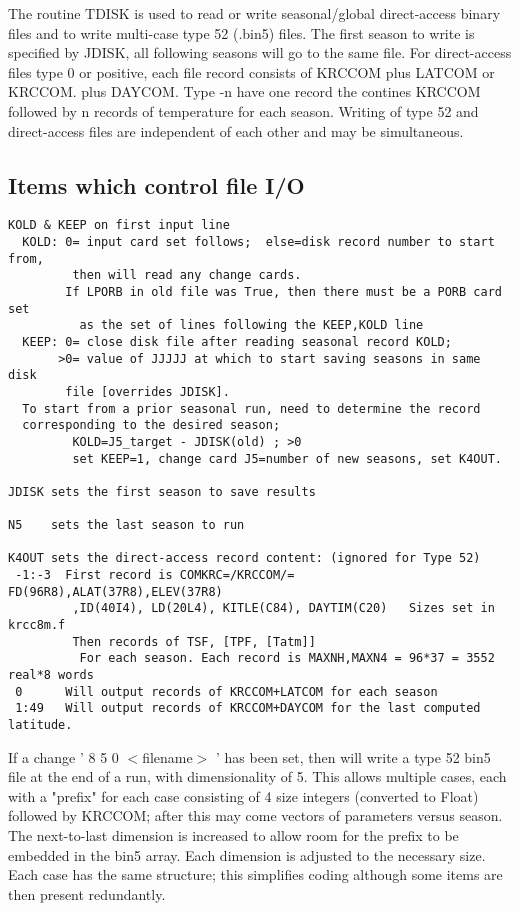 \documentclass{article}
\begin{document}
The routine TDISK is used to read or write seasonal/global direct-access binary
files and to write multi-case type 52 (.bin5) files. The first season to write
is specified by JDISK, all following seasons will go to the same file. For
direct-access files type 0 or positive, each file record consists of KRCCOM plus
LATCOM or KRCCOM.  plus DAYCOM. Type -n have one record the contines KRCCOM
followed by n records of temperature for each season. Writing of type 52 and
direct-access files are independent of each other and may be simultaneous.

\subsection{Items which control file I/O } %
\vspace{-3.mm} 
\begin{verbatim}
KOLD & KEEP on first input line
  KOLD: 0= input card set follows;  else=disk record number to start from,
         then will read any change cards.
        If LPORB in old file was True, then there must be a PORB card set 
          as the set of lines following the KEEP,KOLD line
  KEEP: 0= close disk file after reading seasonal record KOLD;
       >0= value of JJJJJ at which to start saving seasons in same disk 
        file [overrides JDISK].
  To start from a prior seasonal run, need to determine the record 
  corresponding to the desired season;
         KOLD=J5_target - JDISK(old) ; >0
         set KEEP=1, change card J5=number of new seasons, set K4OUT.

JDISK sets the first season to save results

N5    sets the last season to run

K4OUT sets the direct-access record content: (ignored for Type 52)
 -1:-3  First record is COMKRC=/KRCCOM/= FD(96R8),ALAT(37R8),ELEV(37R8)
         ,ID(40I4), LD(20L4), KITLE(C84), DAYTIM(C20)   Sizes set in krcc8m.f
         Then records of TSF, [TPF, [Tatm]]
          For each season. Each record is MAXNH,MAXN4 = 96*37 = 3552 real*8 words
 0      Will output records of KRCCOM+LATCOM for each season
 1:49   Will output records of KRCCOM+DAYCOM for the last computed latitude.
\end{verbatim}

If a change ' 8 5 0 $<$filename$>$ ' has been set, then will write a type 52
bin5 file at the end of a run, with dimensionality of 5. This allows multiple
cases, each with a "prefix" for each case consisting of 4 size integers
(converted to Float) followed by KRCCOM; after this may come vectors of
parameters versus season. The next-to-last dimension is increased to allow room
for the prefix to be embedded in the bin5 array.  Each dimension is adjusted to
the necessary size. Each case has the same structure; this simplifies coding
although some items are then present redundantly.
\end{document}
